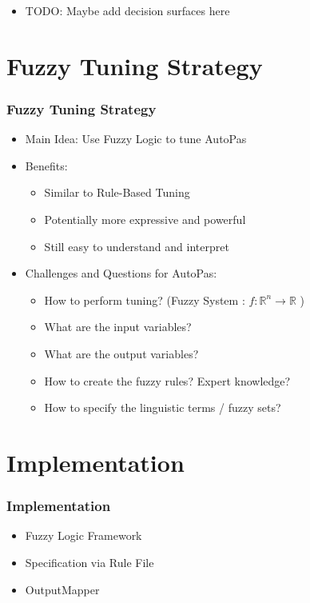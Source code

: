 \documentclass[
	10pt,
	t		%
]{beamer}
\begin{document}
\begin{frame}
	\begin{itemize}
		\item TODO: Maybe add decision surfaces here
	\end{itemize}
\end{frame}

\section{Fuzzy Tuning Strategy}
\begin{frame}
	\frametitle{Fuzzy Tuning Strategy}

	\begin{itemize}
		\item Main Idea: Use Fuzzy Logic to tune AutoPas
		\item Benefits:
		      \begin{itemize}
			      \item Similar to Rule-Based Tuning
			      \item Potentially more expressive and powerful
			      \item Still easy to understand and interpret
		      \end{itemize}
		\item Challenges and Questions for AutoPas:
		      \begin{itemize}
			      \item How to perform tuning? (Fuzzy System : $f :\mathbb{R}^n \rightarrow \mathbb{R}$ )
			      \item What are the input variables?
			      \item What are the output variables?
			      \item How to create the fuzzy rules? Expert knowledge?
			      \item How to specify the linguistic terms / fuzzy sets?
		      \end{itemize}
	\end{itemize}
\end{frame}

\section{Implementation}
\begin{frame}
	\frametitle{Implementation}
	\begin{itemize}
		\item Fuzzy Logic Framework
		\item Specification via Rule File
		\item OutputMapper
	\end{itemize}
\end{frame}
\end{document}
